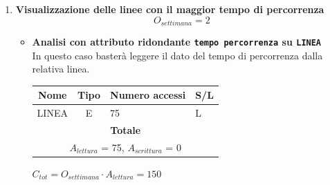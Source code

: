 \documentclass[12pt,a4paper]{report}
\begin{document}
\begin{enumerate}[label=\textbf{\arabic*)}]

    \item \textbf{Visualizzazione delle linee con il maggior tempo di percorrenza} \label{op14} \\
            \[ {O_{settimana} = 2} \]
           \begin{itemize}
            \item \textbf{Analisi con attributo ridondante \texttt{tempo percorrenza} su \texttt{LINEA}} \\
        In questo caso basterà leggere il dato del tempo di percorrenza dalla relativa linea.
        \begin{table}[H]
        \centering
        \begin{tabular}{|c|c|l|l|}
        \hline
        \textbf{Nome} & \textbf{Tipo} & \textbf{Numero accessi} & \textbf{S/L} \\
        \hline
        LINEA & E & 75 & L \\
        \hline
        \multicolumn{4}{c}{\textbf{Totale}} \\
        \multicolumn{4}{c}{${A_{lettura}}$ = 75, ${A_{scrittura}}$ = 0} \\
        \hline
        \end{tabular}
        \end{table}
        \begin{center}
        ${C_{tot} = {O_{settimana}}\cdot {A_{lettura}} = 150}$
        \end{center}


\end{itemize}
\end{enumerate}
\end{document}
